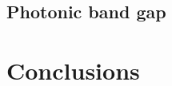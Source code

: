 \documentclass[a4paper,10pt]{article}
\renewenvironment{figure}
  {\par\medskip\noindent\minipage{\linewidth}}
  {\endminipage\par\medskip}
\begin{document}
\begin{multicols}{2}
\begin{figure}
\centering
 \resizebox{\textwidth}{!}{}
 \label{fig:test-uniform}
\end{figure}

\subsection{Photonic band gap}



\section{Conclusions}




\end{multicols}
\end{document}
